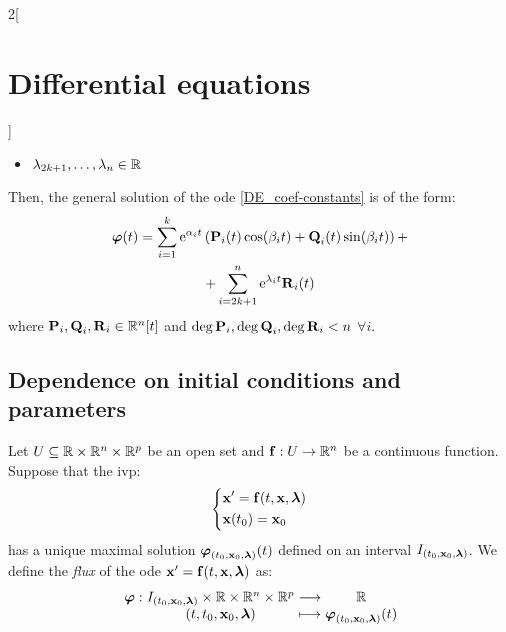 \documentclass[../../../main.tex]{subfiles}
\begin{document}
\begin{multicols}{2}[\section{Differential equations}]
\begin{corollary}
\begin{itemize}
      \item $\lambda_{2k+1},\ldots,\lambda_n\in\mathbb{R}$
    \end{itemize}
    Then, the general solution of the ode \eqref{DE_coef-constants} is of the form:
    \begin{multline*}
      \boldsymbol{\mathrm{\varphi}}(t)=\sum_{i=1}^k\mathrm{e}^{\alpha_i t}\left(\boldsymbol{\mathrm{P}}_i(t)\cos(\beta_i t)+\boldsymbol{\mathrm{Q}}_i(t)\sin(\beta_i t)\right)+\\+\sum_{i=2k+1}^n\mathrm{e}^{\lambda_i t}\boldsymbol{\mathrm{R}}_i(t)
    \end{multline*}
    where $\boldsymbol{\mathrm{P}}_i,\boldsymbol{\mathrm{Q}}_i,\boldsymbol{\mathrm{R}}_i\in\mathbb{R}^n[t]$ and $\deg \boldsymbol{\mathrm{P}}_i,\deg\boldsymbol{\mathrm{Q}}_i,\deg\boldsymbol{\mathrm{R}}_i<n$ $\forall i$.
  \end{corollary}
  \subsection{Dependence on initial conditions and parameters}
  \begin{definition}
    Let $U\subseteq\mathbb{R}\times\mathbb{R}^n\times\mathbb{R}^p$ be an open set and $\boldsymbol{\mathrm{f}}:U\rightarrow\mathbb{R}^n$ be a continuous function. Suppose that the ivp:
    \begin{equation}\label{DE_ivp_lambda}
      \left\{
      \begin{aligned}
         & \boldsymbol{\mathrm{x}}'      =\boldsymbol{\mathrm{f}}(t,\boldsymbol{\mathrm{x}},\boldsymbol{\mathrm{\lambda}}) \\
         & \boldsymbol{\mathrm{x}}(t_0)  =\boldsymbol{\mathrm{x}}_0
      \end{aligned}
      \right.
    \end{equation}
    has a unique maximal solution $\boldsymbol{\mathrm{\varphi}}_{(t_0,\boldsymbol{\mathrm{x}}_0,\boldsymbol{\mathrm{\lambda}})}(t)$ defined on an interval $I_{(t_0,\boldsymbol{\mathrm{x}}_0,\boldsymbol{\mathrm{\lambda}})}$. We define the \textit{flux} of the ode $\boldsymbol{\mathrm{x}}'=\boldsymbol{\mathrm{f}}(t,\boldsymbol{\mathrm{x}},\boldsymbol{\mathrm{\lambda}})$ as: $$\function{\vectorfunction{\varphi}}{I_{(t_0,\vectorfunction{x}_0,\vectorfunction{\lambda})}\times\RR\times\RR^n\times\RR^p}{\RR}{(t,t_0,\vectorfunction{x}_0,\vectorfunction{\lambda})}{\vectorfunction{\varphi}_{(t_0,\vectorfunction{x}_0,\vectorfunction{\lambda})}(t)}$$
  \end{definition}

\end{multicols}
\end{document}
